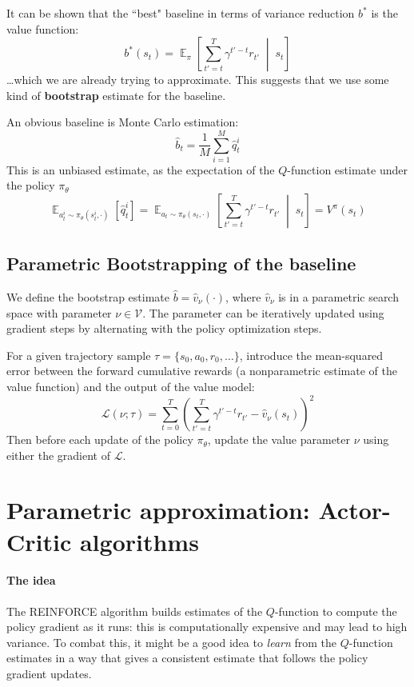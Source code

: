 \documentclass[12pt]{report}
\newcommand{\scalemid}{\;\middle|\;}
\DeclareMathOperator{\EE}{\mathbb{E}}
\newcommand{\calL}{\mathcal{L}}
\begin{document}
It can be shown that the ``best" baseline in terms of variance reduction $b^*$ is the value function:
\[
	b^*(s_t) = \EE_\pi\left[\sum_{t'=t}^T \gamma^{t'-t} r_{t'} \scalemid s_t \right]
\]
\ldots which we are already trying to approximate. This suggests that we use some kind of \textbf{bootstrap} estimate for the baseline.

An obvious baseline is Monte Carlo estimation:
\[
	\hat{b}_t =
	\frac{1}{M}\sum_{i=1}^M \hat{q}^i_t
\]
This is an unbiased estimate, as the expectation of the $Q$-function estimate under the policy $\pi_\theta$
\[
	\EE_{a_t^i\sim \pi_\theta(s_t^i,\cdot)}\left[\hat{q}^i_t\right] =
	\EE_{a_t\sim\pi_\theta(s_t,\cdot)}
	\left[
	\sum_{t'=t}^T \gamma^{t'-t}r_{t'}\scalemid s_t
	\right] = V^\pi(s_t)
\]


\subsection{Parametric Bootstrapping of the baseline}

We define the bootstrap estimate $\hat{b} = \hat{v}_\nu(\cdot)$, where $\hat{v}_\nu$ is in a parametric search space with parameter $\nu \in \mathcal{V}$. The parameter can be iteratively updated using gradient steps by alternating with the policy optimization steps.

For a given trajectory sample $\tau=\{s_0,a_0,r_0,\ldots\}$, introduce the mean-squared error between the forward cumulative rewards (a nonparametric estimate of the value function) and the output of the value model:
\[
	\calL(\nu; \tau) =
	\sum_{t=0}^{T} \left(
	\sum_{t'=t}^{T}
	\gamma^{t'-t} r_{t'}
	- \hat{v}_\nu(s_t)
	\right)^2
\]
Then before each update of the policy $\pi_\theta$, update the value parameter $\nu$ using either the gradient of $\calL$.



\section{Parametric approximation: Actor-Critic algorithms}


\paragraph{The idea} The REINFORCE algorithm builds estimates of the $Q$-function to compute the policy gradient as it runs: this is computationally expensive and may lead to high variance. To combat this, it might be a good idea to \textit{learn} from the $Q$-function estimates in a way that gives a consistent estimate that follows the policy gradient updates.
\end{document}
